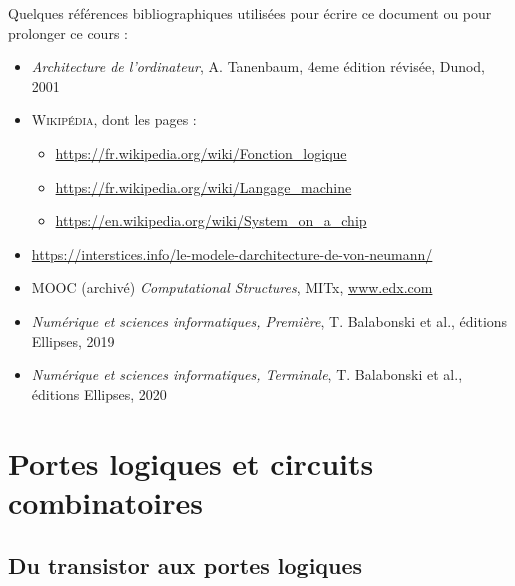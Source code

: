 \documentclass[11pt,a4paper,french,twoside]{PMCours}
\begin{document}
Quelques références bibliographiques utilisées pour écrire ce document ou pour prolonger ce cours : 
\begin{itemize}
 \item \emph{Architecture de l'ordinateur}, A. Tanenbaum, 4eme édition révisée, Dunod, 2001
 \item \textsc{Wikipédia}, dont les pages :
 \begin{itemize}
  \item \url{https://fr.wikipedia.org/wiki/Fonction_logique}
  \item \url{https://fr.wikipedia.org/wiki/Langage_machine}
  \item \url{https://en.wikipedia.org/wiki/System_on_a_chip}
 \end{itemize}
 \item \url{https://interstices.info/le-modele-darchitecture-de-von-neumann/}
 \item MOOC (archivé) \emph{Computational Structures}, MITx, \url{www.edx.com}
 \item \emph{Numérique et sciences informatiques, Première}, T. Balabonski et al., éditions Ellipses, 2019
 \item \emph{Numérique et sciences informatiques, Terminale}, T. Balabonski et al., éditions Ellipses, 2020
\end{itemize}




\section{Portes logiques et circuits combinatoires}


\subsection{Du transistor aux portes logiques}
\end{document}
